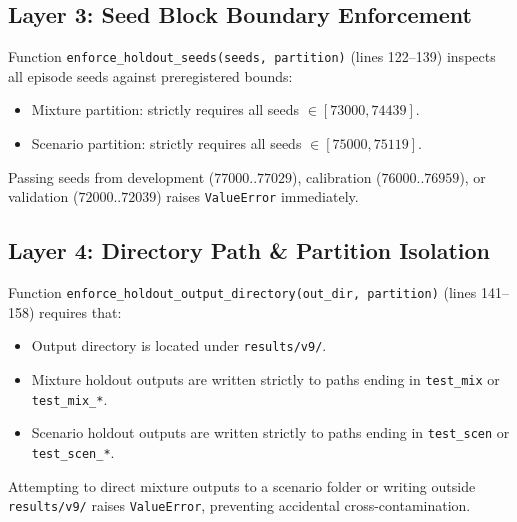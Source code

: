 \documentclass[10pt,a4paper]{article}
\begin{document}
\subsection{Layer 3: Seed Block Boundary Enforcement}
Function \texttt{enforce\_holdout\_seeds(seeds, partition)} (lines 122--139) inspects all episode seeds against preregistered bounds:
\begin{itemize}
    \item Mixture partition: strictly requires all seeds $\in [73000, 74439]$.
    \item Scenario partition: strictly requires all seeds $\in [75000, 75119]$.
\end{itemize}
Passing seeds from development ($77000..77029$), calibration ($76000..76959$), or validation ($72000..72039$) raises \texttt{ValueError} immediately.

\subsection{Layer 4: Directory Path \& Partition Isolation}
Function \texttt{enforce\_holdout\_output\_directory(out\_dir, partition)} (lines 141--158) requires that:
\begin{itemize}
    \item Output directory is located under \texttt{results/v9/}.
    \item Mixture holdout outputs are written strictly to paths ending in \texttt{test\_mix} or \texttt{test\_mix\_*}.
    \item Scenario holdout outputs are written strictly to paths ending in \texttt{test\_scen} or \texttt{test\_scen\_*}.
\end{itemize}
Attempting to direct mixture outputs to a scenario folder or writing outside \texttt{results/v9/} raises \texttt{ValueError}, preventing accidental cross-contamination.
\end{document}
